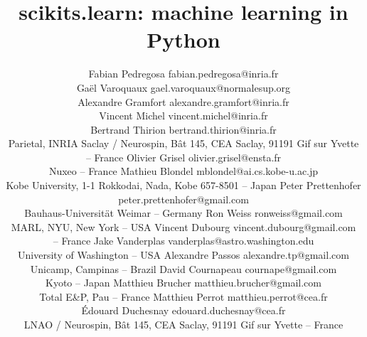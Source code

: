 \documentclass[twoside,11pt]{article}
\begin{document}
\title{scikits.learn: machine learning in Python}


\author{\name Fabian Pedregosa \email fabian.pedregosa@inria.fr \\
        \name Ga\"el Varoquaux \email gael.varoquaux@normalesup.org  \\
        \name Alexandre Gramfort \email alexandre.gramfort@inria.fr \\
        \name Vincent Michel  \email vincent.michel@inria.fr \\
        \name Bertrand Thirion  \email bertrand.thirion@inria.fr \\
        \addr Parietal, INRIA Saclay / Neurospin, 
	    B\^at 145, CEA Saclay, 91191 Gif sur Yvette -- {\sc France}
        \AND
        \name Olivier Grisel \email olivier.grisel@ensta.fr \\
        \addr Nuxeo -- {\sc France} 
        \AND
        \name Mathieu Blondel \email mblondel@ai.cs.kobe-u.ac.jp \\
        \addr Kobe University, 1-1 Rokkodai, Nada, Kobe 657-8501 -- {\sc Japan} 
        \AND
        \name Peter Prettenhofer \email peter.prettenhofer@gmail.com \\
        \addr Bauhaus-Universit\"at Weimar -- {\sc Germany}
        \AND
        \name Ron Weiss \email ronweiss@gmail.com \\
        \addr MARL, NYU, New York -- {\sc USA}
        \AND
        \name Vincent Dubourg \email vincent.dubourg@gmail.com\\
        \addr  -- {\sc France}
        \AND
        \name Jake Vanderplas \email vanderplas@astro.washington.edu\\
        \addr University of Washington -- {\sc USA}
	\AND
        \name Alexandre Passos \email alexandre.tp@gmail.com \\
        \addr Unicamp,  Campinas -- {\sc Brazil}
        \AND
        \name David Cournapeau \email cournape@gmail.com \\
        \addr Kyoto -- {\sc Japan}
        \AND
        \name Matthieu Brucher \email matthieu.brucher@gmail.com \\
        \addr Total E\&P,  Pau -- {\sc France}
        \AND
        \name Matthieu Perrot \email matthieu.perrot@cea.fr\\
        \name \'Edouard Duchesnay \email edouard.duchesnay@cea.fr \\
        \addr LNAO / Neurospin, 
	    B\^at 145, CEA Saclay, 91191 Gif sur Yvette -- {\sc France}
}
\end{document}
